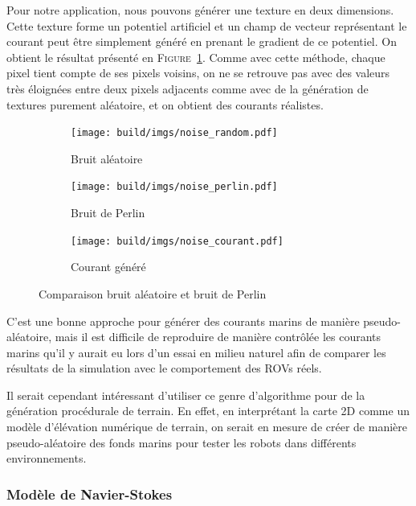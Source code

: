 				Pour notre application, nous pouvons générer une texture en deux dimensions. Cette texture forme un potentiel artificiel et un champ de vecteur représentant le courant peut être simplement généré en prenant le gradient de ce potentiel. On obtient le résultat présenté en \textsc{Figure}~\ref{fig:perlin_noise}. Comme avec cette méthode, chaque pixel tient compte de ses pixels voisins, on ne se retrouve pas avec des valeurs très éloignées entre deux pixels adjacents comme avec de la génération de textures purement aléatoire, et on obtient des courants réalistes.

				\begin{figure}[!htb]
					\centering
					\begin{subfigure}[b]{0.32\textwidth}
						\centering
						\texttt{[image: build/imgs/noise\_random.pdf]}
						\caption{Bruit aléatoire}
					\end{subfigure}
					\hfill
					\begin{subfigure}[b]{0.32\textwidth}
						\centering
						\texttt{[image: build/imgs/noise\_perlin.pdf]}
						\caption{Bruit de Perlin}
					\end{subfigure}
					\hfill
					\begin{subfigure}[b]{0.32\textwidth}
						\centering
						\texttt{[image: build/imgs/noise\_courant.pdf]}
						\caption{Courant généré}
					\end{subfigure}
					\caption{Comparaison bruit aléatoire et bruit de Perlin}
					\label{fig:perlin_noise}
				\end{figure}

				C'est une bonne approche pour générer des courants marins de manière pseudo-aléatoire, mais il est difficile de reproduire de manière contrôlée les courants marins qu'il y aurait eu lors d'un essai en milieu naturel afin de comparer les résultats de la simulation avec le comportement des \gls{ROV}s réels.
				
				Il serait cependant intéressant d'utiliser ce genre d'algorithme pour de la génération procédurale de terrain. En effet, en interprétant la carte 2D comme un modèle d'élévation numérique de terrain, on serait en mesure de créer de manière pseudo-aléatoire des fonds marins pour tester les robots dans différents environnements.

			\subsubsection{Modèle de Navier-Stokes}

